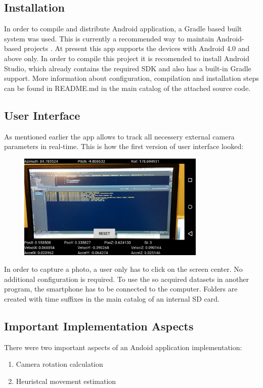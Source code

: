 \subsection{Installation}
In order to compile and distribute Android application, a Gradle based built system was used. This is currently a recommended way to maintain Android-based projects \cite{website:gradle}. At present this app supports the devices with Android 4.0 and above only. In order to compile this project it is recomended to install Android Studio, which already contains the required SDK and also has a built-in Gradle support. More information about configuration, compilation and installation steps can be found in README.md in the main catalog of the attached source code. 
\subsection{User Interface}
As mentioned earlier the app allows to track all necessery external camera parameters in real-time. This is how the first version of user interface looked:
\begin{figure}[h!]
    \centering
    \includegraphics[width=0.8\textwidth]{AndroidScreenShot}
    \caption{}
    \label{fig:AndroidScreenShot}
\end{figure}
\clearpage
In order to capture a photo, a user only has to click on the screen center. No additional configuration is required. To use the so acquired datasets in another program, the smartphone has to be connected to the computer. Folders are created with time suffixes in the main catalog of an internal SD card.
\subsection{Important Implementation Aspects}
There were two important aspects of an Andoid application implementation:
\begin{enumerate}
\item Camera rotation calculation
\item Heuristcal movement estimation
\end{enumerate}
